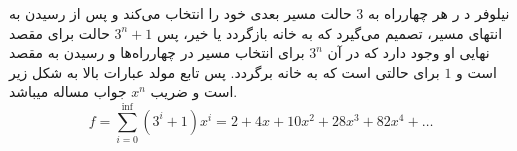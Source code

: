 \documentclass[12pt,onecolumn,a4paper]{article}
\begin{document}
	نیلوفر د ر هر چهارراه به 3 حالت مسیر بعدی خود را انتخاب می‌کند و پس از رسیدن به انتهای مسیر، تصمیم می‌گیرد که به خانه بازگردد یا خیر، پس 
	$3^n + 1$
	حالت برای مقصد نهایی او وجود دارد که در آن
	$3^n$
	برای انتخاب مسیر در چهارراه‌ها و رسیدن به مقصد است و
	$1$
	برای حالتی است که به خانه برگردد.
	پس تابع مولد عبارات بالا به شکل زیر است و ضریب $x^n$
	جواب مساله میباشد.
	$$f = \sum\limits_{i=0}^{\inf} (3^i + 1) x^i = 2 + 4x + 10x^2 + 28x^3 + 82x^4 + \ldots$$
\end{document}
